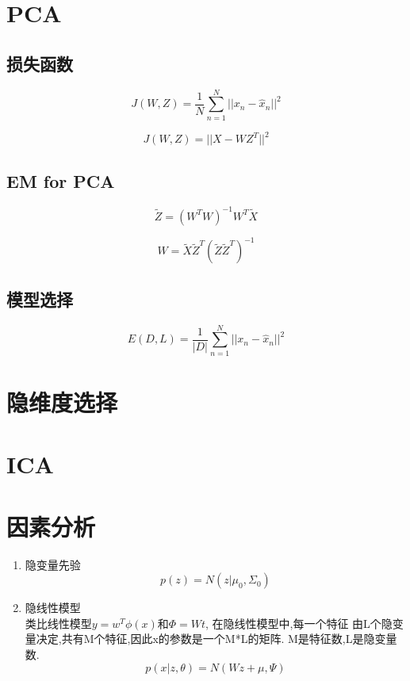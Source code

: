 \section{PCA}
\subsection{损失函数}
\begin{equation}
J(W,Z) = \frac{1}{N}
\sum_{n=1}^N||x_n-\hat x_n||^2
\end{equation}

\begin{equation}
J(W,Z) = ||X-WZ^T||^2
\end{equation}

\subsection{EM for PCA}

\begin{equation}
\widetilde{Z} = (W^TW)^{-1}W^T\widetilde{X}
\end{equation}

\begin{equation}
W = \widetilde{X}\widetilde{Z}^T
(\widetilde{Z}\widetilde{Z}^T)^{-1}
\end{equation}

\subsection{模型选择}
\begin{equation}
E(D, L) = \frac{1}{|D|}\sum_{n=1}^N||x_n - \hat{x}_n||^2
\end{equation}



\section{隐维度选择}
\section{ICA}

\section{因素分析}
\begin{enumerate}
\item 隐变量先验
\begin{equation}
p(z) = N(z|\mu_0, \Sigma_0)
\end{equation}
\item 隐线性模型\\
类比线性模型$y = w^T\phi(x)$和$\Phi = Wt$, 在隐线性模型中,每一个特征
由L个隐变量决定,共有M个特征,因此x的参数是一个M*L的矩阵.
M是特征数,L是隐变量数.
\begin{equation}
p(x|z, \theta) = N(Wz + \mu, \Psi)
\end{equation}
\end{enumerate}

